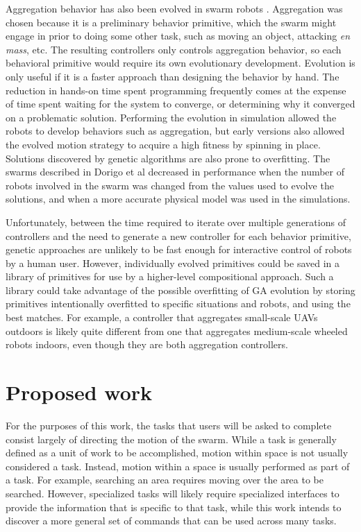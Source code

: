 \documentclass[]{article}
\begin{document}
Aggregation behavior has also been evolved in swarm robots \cite{bahgecci2005evolving, dorigo2004evolving}.  
Aggregation was chosen because it is a preliminary behavior primitive, which the swarm might engage in prior to doing some other task, such as moving an object, attacking \emph{en mass}, etc.
The resulting controllers only controls aggregation behavior, so each behavioral primitive would require its own evolutionary development. 
Evolution is only useful if it is a faster approach than designing the behavior by hand. 
The reduction in hands-on time spent programming frequently comes at the expense of time spent waiting for the system to converge, or determining why it converged on a problematic solution. 
Performing the evolution in simulation allowed the robots to develop behaviors such as aggregation, but early versions also allowed the evolved motion strategy to acquire a high fitness by spinning in place. 
Solutions discovered by genetic algorithms are also prone to overfitting. 
The swarms described in Dorigo et al decreased in performance when the number of robots involved in the swarm was changed from the values used to evolve the solutions, and when a more accurate physical model was used in the simulations.

Unfortunately, between the time required to iterate over multiple generations of controllers and the need to generate a new controller for each behavior primitive, genetic approaches are unlikely to be fast enough for interactive control of robots by a human user. 
However, individually evolved primitives could be saved in a library of primitives for use by a higher-level compositional approach. 
Such a library could take advantage of the possible overfitting of GA evolution by storing primitives intentionally overfitted to specific situations and robots, and using the best matches. 
For example, a controller that aggregates small-scale UAVs outdoors is likely quite different from one that aggregates medium-scale wheeled robots indoors, even though they are both aggregation controllers. 

\section{Proposed work}

For the purposes of this work, the tasks that users will be asked to complete consist largely of directing the motion of the swarm. 
While a task is generally defined as a unit of work to be accomplished, motion within space is not usually considered a task. 
Instead, motion within a space is usually performed as part of a task.
For example, searching an area requires moving over the area to be searched.
However, specialized tasks will likely require specialized interfaces to provide the information that is specific to that task, while this work intends to discover a more general set of commands that can be used across many tasks. 
\end{document}
